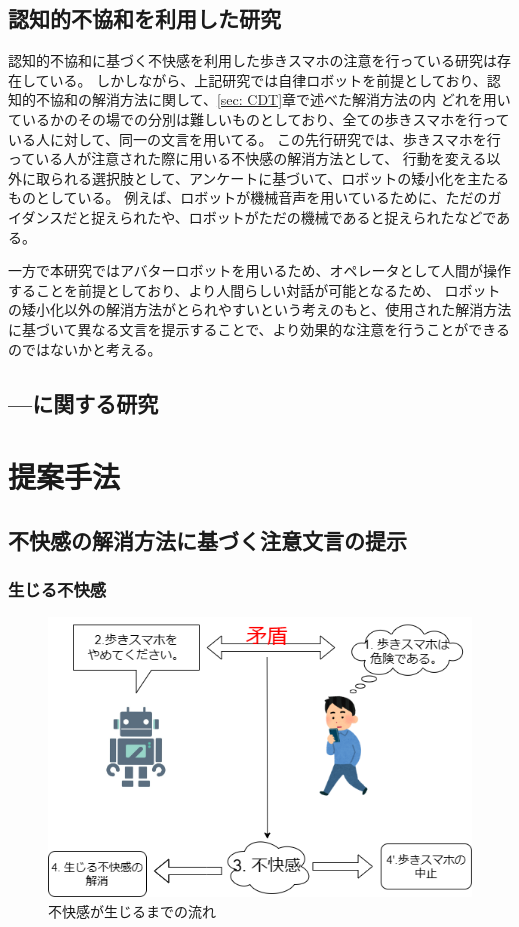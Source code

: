 \documentclass[11pt,a4j]{jreport}
\begin{document}
\section{認知的不協和を利用した研究}
認知的不協和に基づく不快感を利用した歩きスマホの注意を行っている研究は存在している\cite{Schneider2022}。
しかしながら、上記研究では自律ロボットを前提としており、認知的不協和の解消方法に関して、\ref{sec: CDT}章で述べた解消方法の内
どれを用いているかのその場での分別は難しいものとしており、全ての歩きスマホを行っている人に対して、同一の文言を用いてる。
この先行研究では、歩きスマホを行っている人が注意された際に用いる不快感の解消方法として、
行動を変える以外に取られる選択肢として、アンケートに基づいて、ロボットの矮小化を主たるものとしている。
例えば、ロボットが機械音声を用いているために、ただのガイダンスだと捉えられたや、ロボットがただの機械であると捉えられたなどである。


一方で本研究ではアバターロボットを用いるため、オペレータとして人間が操作することを前提としており、より人間らしい対話が可能となるため、
ロボットの矮小化以外の解消方法がとられやすいという考えのもと、使用された解消方法に基づいて異なる文言を提示することで、より効果的な注意を行うことができるのではないかと考える。


\section{---に関する研究}

\chapter{提案手法}
\section{不快感の解消方法に基づく注意文言の提示}
\subsection{生じる不快感}
\label{sec: dissonance}
\begin{figure}[htbp]
  \label{fig: dissonance}
  \includegraphics[width=13cm]{img/CDT.png}
  \caption{不快感が生じるまでの流れ}
\end{figure}
\end{document}

